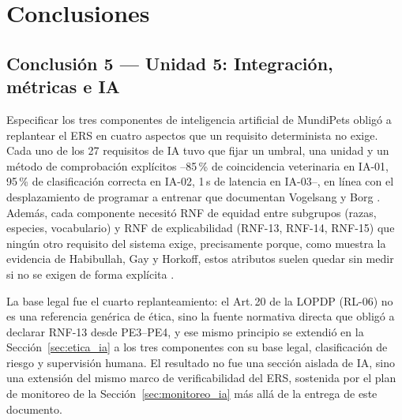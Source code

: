 \documentclass[journal,onecolumn]{IEEEtran}
\begin{document}
	

	\section{Conclusiones}
	
	
	\subsection*{Conclusión 5 --- Unidad 5: Integración, métricas e IA}
Especificar los tres componentes de inteligencia artificial de MundiPets obligó a replantear
el ERS en cuatro aspectos que un requisito determinista no exige. Cada uno de los 27
requisitos de IA tuvo que fijar un umbral, una unidad y un método de comprobación explícitos
--85\,\% de coincidencia veterinaria en IA-01, 95\,\% de clasificación correcta en IA-02, 1\,s
de latencia en IA-03--, en línea con el desplazamiento de programar a entrenar que documentan
Vogelsang y Borg \cite{vogelsang2019}. Además, cada componente necesitó RNF de equidad entre
subgrupos (razas, especies, vocabulario) y RNF de explicabilidad (RNF-13, RNF-14, RNF-15) que
ningún otro requisito del sistema exige, precisamente porque, como muestra la evidencia de
Habibullah, Gay y Horkoff, estos atributos suelen quedar sin medir si no se exigen de forma
explícita \cite{habibullah2023}.

La base legal fue el cuarto replanteamiento: el Art.\,20 de la LOPDP (RL-06) no es una
referencia genérica de ética, sino la fuente normativa directa que obligó a declarar RNF-13
desde PE3--PE4, y ese mismo principio se extendió en la Sección~\ref{sec:etica_ia} a los tres
componentes con su base legal, clasificación de riesgo \cite{euaiact2024} y supervisión humana.
El resultado no fue una sección aislada de IA, sino una extensión del mismo marco de
verificabilidad del ERS, sostenida por el plan de monitoreo de la Sección~\ref{sec:monitoreo_ia}
más allá de la entrega de este documento.
	\newpage
	
	
\end{document}
